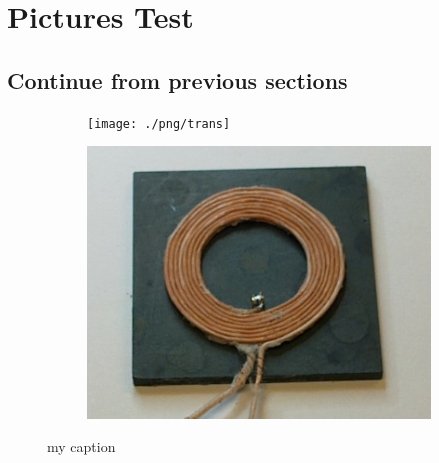 \section{Pictures Test}
  \subsection{Continue from previous sections}

\begin{frame}
  \begin{figure} \centering
    \begin{subfigure}[b]{\linewidth}
        \texttt{[image: ./png/trans]}
        \label{fig:a}
    \end{subfigure} %

    \begin{subfigure}[b]{\linewidth}    
        \includegraphics[scale=0.28]{./png/rec}
        \label{fig:b}    
    \end{subfigure} 
    \caption{my caption}
\end{figure}
\end{frame}

